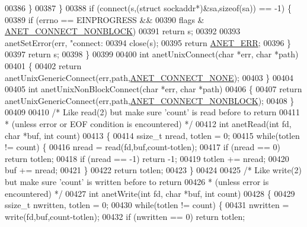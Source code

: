 \begin{DoxyCode}
{{{{{{{{{{{{{{{{{{00386         \}
00387     \}
00388     \textcolor{keywordflow}{if} (connect(s,(\textcolor{keyword}{struct} sockaddr*)&sa,\textcolor{keyword}{sizeof}(sa)) == -1) \{
00389         \textcolor{keywordflow}{if} (errno == EINPROGRESS &&
00390             flags & \hyperlink{anet_8c_a487909d18aa88f156b4ef393bc9ceaed}{ANET\_CONNECT\_NONBLOCK})
00391             \textcolor{keywordflow}{return} s;
00392 
00393         anetSetError(err, \textcolor{stringliteral}{"connect: %
00394         close(s);
00395         \textcolor{keywordflow}{return} \hyperlink{anet_8h_a0697b7774a7e0f4ef141839fe93536fe}{ANET\_ERR};
00396     \}
00397     \textcolor{keywordflow}{return} s;
00398 \}
00399 
00400 \textcolor{keywordtype}{int} anetUnixConnect(\textcolor{keywordtype}{char} *err, \textcolor{keywordtype}{char} *path)
00401 \{
00402     \textcolor{keywordflow}{return} anetUnixGenericConnect(err,path,\hyperlink{anet_8c_a8e16527c2634344c5ff2d2c3db91d318}{ANET\_CONNECT\_NONE});
00403 \}
00404 
00405 \textcolor{keywordtype}{int} anetUnixNonBlockConnect(\textcolor{keywordtype}{char} *err, \textcolor{keywordtype}{char} *path)
00406 \{
00407     \textcolor{keywordflow}{return} anetUnixGenericConnect(err,path,\hyperlink{anet_8c_a487909d18aa88f156b4ef393bc9ceaed}{ANET\_CONNECT\_NONBLOCK});
00408 \}
00409 
00410 \textcolor{comment}{/* Like read(2) but make sure 'count' is read before to return}
00411 \textcolor{comment}{ * (unless error or EOF condition is encountered) */}
00412 \textcolor{keywordtype}{int} anetRead(\textcolor{keywordtype}{int} fd, \textcolor{keywordtype}{char} *buf, \textcolor{keywordtype}{int} count)
00413 \{
00414     ssize\_t nread, totlen = 0;
00415     \textcolor{keywordflow}{while}(totlen != count) \{
00416         nread = read(fd,buf,count-totlen);
00417         \textcolor{keywordflow}{if} (nread == 0) \textcolor{keywordflow}{return} totlen;
00418         \textcolor{keywordflow}{if} (nread == -1) \textcolor{keywordflow}{return} -1;
00419         totlen += nread;
00420         buf += nread;
00421     \}
00422     \textcolor{keywordflow}{return} totlen;
00423 \}
00424 
00425 \textcolor{comment}{/* Like write(2) but make sure 'count' is written before to return}
00426 \textcolor{comment}{ * (unless error is encountered) */}
00427 \textcolor{keywordtype}{int} anetWrite(\textcolor{keywordtype}{int} fd, \textcolor{keywordtype}{char} *buf, \textcolor{keywordtype}{int} count)
00428 \{
00429     ssize\_t nwritten, totlen = 0;
00430     \textcolor{keywordflow}{while}(totlen != count) \{
00431         nwritten = write(fd,buf,count-totlen);
00432         \textcolor{keywordflow}{if} (nwritten == 0) \textcolor{keywordflow}{return} totlen;
}}}}}}}}}}}}}}}}}}}
\end{DoxyCode}
